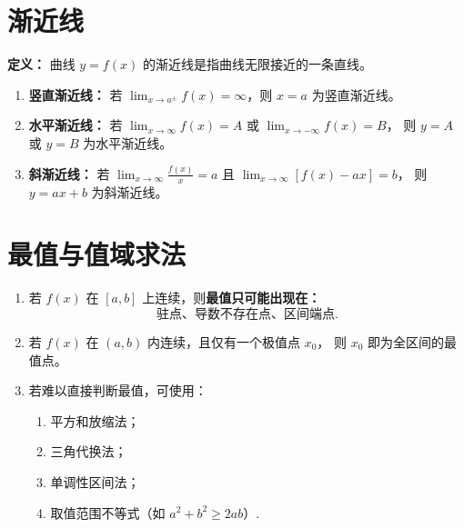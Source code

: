 \section{渐近线}

\textbf{定义：} 曲线 $y=f(x)$ 的渐近线是指曲线无限接近的一条直线。

\begin{enumerate}
    \item \textbf{竖直渐近线：}
          若 $\displaystyle \lim_{x\to a^\pm}f(x)=\infty$，则 $x=a$ 为竖直渐近线。

    \item \textbf{水平渐近线：}
          若 $\displaystyle \lim_{x\to\infty}f(x)=A$ 或 $\lim_{x\to-\infty}f(x)=B$，
          则 $y=A$ 或 $y=B$ 为水平渐近线。

    \item \textbf{斜渐近线：}
          若 $\displaystyle \lim_{x\to\infty}\frac{f(x)}{x}=a$ 且 $\lim_{x\to\infty}[f(x)-ax]=b$，
          则 $y=ax+b$ 为斜渐近线。
\end{enumerate}

\section{最值与值域求法}
\DTwoThree
\begin{enumerate}
    \item 若 $f(x)$ 在 $[a,b]$ 上连续，则\textbf{最值只可能出现在：}
          \[
              \text{驻点、导数不存在点、区间端点}.
          \]
    \item 若 $f(x)$ 在 $(a,b)$ 内连续，且仅有一个极值点 $x_0$，
          则 $x_0$ 即为全区间的最值点。
    \item 若难以直接判断最值，可使用：
          \begin{enumerate}
              \item 平方和放缩法；
              \item 三角代换法；
              \item 单调性区间法；
              \item 取值范围不等式（如 $a^2+b^2\ge2ab$）.
          \end{enumerate}
\end{enumerate}